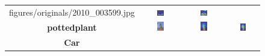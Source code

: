 \begin{figure}[ht]
\begin{tcolorbox}[colframe=black!60, colback=white, boxrule=0.8pt, arc=2pt, left=2pt, right=2pt, top=2pt, bottom=2pt]
\begin{tabular}{c c c c}
      {figures/originals/2010_003599.jpg}
       & \includegraphics[width=0.20\textwidth,height=0.20\textwidth]
      {figures/val_cams/weclip/2010_003599_3.jpg}
       & \includegraphics[width=0.20\textwidth,height=0.20\textwidth]
      {figures/val_cams/ours/2010_003599_3.jpg}
      \\
      \textbf{pottedplant}
       & \includegraphics[width=0.20\textwidth,height=0.20\textwidth]
      {figures/originals/2011_000145.jpg}
       & \includegraphics[width=0.20\textwidth,height=0.20\textwidth]
      {figures/val_cams/weclip/2011_000145_15.jpg}
       & \includegraphics[width=0.20\textwidth,height=0.20\textwidth]
      {figures/val_cams/ours/2011_000145_15.jpg}
      \\
      \textbf{Car}
       & \includegraphics[width=0.20\textwidth,height=0.20\textwidth]

\end{tabular}
\end{tcolorbox}
\end{figure}
